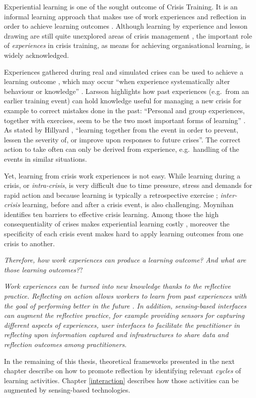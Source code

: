Experiential learning is one of the sought outcome of Crisis Training.
It is an informal learning approach that makes use of work experiences
and reflection in order to achieve learning outcomes
\autocite{kolb1984organizational}. Although learning by experience and
lesson drawing are still quite unexplored areas of crisis management
\autocites{Lagadec:1997js}{Boin:2007wt}{Stern:1997eb}, the important
role of \emph{experiences} in crisis training, as means for achieving
organisational learning, is widely acknowledged.

Experiences gathered during real and simulated crises can be used to
achieve a learning outcome \autocite{Deverell:2009fk}, which may occur
``when experience systematically alter behaviour or knowledge''
\autocite[p.233]{Schwab:2007iw}. Larsson \autocite{Larsson:2010jr}
highlights how past experiences (e.g.~from an earlier training event)
can hold knowledge useful for managing a new crisis for example to
correct mistakes done in the past: ``Personal and group experiences,
together with exercises, seem to be the two most important forms of
learning'' \autocite[p.714]{Larsson:2010jr}. As stated by Hillyard
\autocite*{Hillyard:SYlJRQLN}, ``learning together from the event in
order to prevent, lessen the severity of, or improve upon responses to
future crises''. The correct action to take often can only be derived
from experience, e.g.~handling of the events in similar situations.

Yet, learning from crisis work experiences is not easy. While learning
during a crisis, or \emph{intra-crisis}, is very difficult due to time
pressure, stress and demands for rapid action \autocite{Deverell:2009fk}
and because learning is typically a retrospective exercise
\autocite{jasanoff1994learning}; \emph{inter-crisis} learning, before
and after a crisis event, is also challenging. Moynihan
\autocite*{Moynihan:2008gq} identifies ten barriers to effective crisis
learning. Among those the high consequentiality of crises makes
experiential learning costly \autocite{LaPorte:1991gk}, moreover the
specificity of each crisis event makes hard to apply learning outcomes
from one crisis to another.

\emph{Therefore, how work experiences can produce a learning outcome?
And what are those learning outcomes?}?

\emph{Work experiences can be turned into new knowledge thanks to the
reflective practice. Reflecting on action allows workers to learn from
past experiences with the goal of performing better in the future
\autocites{boud1985reflection}{Schon:1983ut}. In addition, sensing-based
interfaces can augment the reflective practice, for example providing
sensors for capturing different aspects of experiences, user interfaces
to facilitate the practitioner in reflecting upon information captured
and infrastructures to share data and reflection outcomes among
practitioners.}

In the remaining of this thesis, theoretical frameworks presented in the
next chapter describe on how to promote reflection by identifying
relevant \emph{cycles} of learning activities. Chapter \ref{interaction}
describes how those activities can be augmented by sensing-based
technologies.
